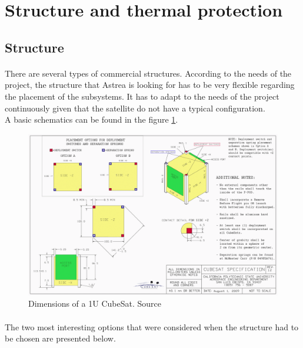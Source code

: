 \section{Structure and thermal protection}
\subsection{Structure}
\paragraph{}There are several types of commercial structures. According to the needs of the project, the structure that Astrea is looking for has to be very flexible regarding the placement of the subsystems. It has to adapt to the needs of the project continuously given that the satellite do not have a typical configuration.\\
A basic schematics can be found in the figure \ref{epsschematics}.

\begin{figure}[h!]
\includegraphics[scale=0.6]{./sections/SatelliteDept/sections/images/CubeSatDesign}
\centering
\caption{Dimensions of a 1U CubeSat. Source \cite{cubesatdimensions}}
\label{epsschematics}
\end{figure}

\paragraph{}The two most interesting options that were considered when the structure had to be chosen are presented below.

